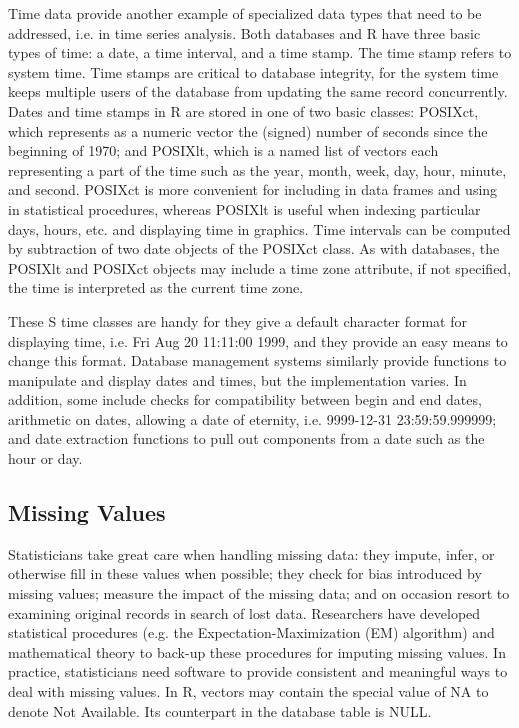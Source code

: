 Time data provide another example of specialized data types that need to
be addressed, i.e. in time series analysis.
Both databases and R have three basic types of time: a date, a time interval, 
and a time stamp.
The time stamp refers to system time. 
Time stamps are critical to database integrity, for the system time keeps
multiple users of the database from updating the same record concurrently.
Dates and time stamps in R are stored in one of two basic classes: 
POSIXct, which represents as a numeric vector the (signed) 
number of seconds since the beginning of 1970;  and
POSIXlt, which is a named list of vectors each representing a part of 
the time such as the year, month, week, day, hour, minute, and second.
POSIXct is more convenient for including in data frames and using in
statistical procedures, 
whereas POSIXlt is useful when indexing particular days, hours, etc. 
and displaying time in graphics.
Time intervals can be computed by subtraction of two date objects
of the POSIXct class. 
As with databases, the POSIXlt and POSIXct objects may include a time
zone attribute, if not specified, the time is interpreted as the current
time zone.

These S time classes are handy for they give a default character format for 
displaying  time, i.e. Fri Aug 20 11:11:00 1999, and they provide an easy 
means to change this format. 
Database management systems similarly provide functions to manipulate and
display dates and times, but the implementation varies.
In addition, some include checks for compatibility between begin and 
end dates, arithmetic on dates, allowing a date of eternity, i.e.
9999-12-31 23:59:59.999999;
and date extraction functions to pull out components from a date
such as the hour or day.


\subsection{Missing Values}
Statisticians take great care when handling missing data: they impute,
infer, or otherwise fill in these values when possible; they check for
bias introduced by missing values; measure the impact of the missing
data; and on occasion resort to examining original records in search
of lost data.  Researchers have developed statistical procedures (e.g.
the Expectation-Maximization (EM) algorithm) and mathematical theory
to back-up these procedures for imputing missing values.  In practice,
statisticians need software to provide consistent and meaningful ways
to deal with missing values.  In R, vectors may contain the special
value of NA to denote Not Available.  Its counterpart in the database
table is NULL.

